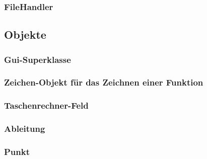 \documentclass[12pt,a4paper]{article}
\newcommand{\project}{/home/jonas/Dokumente/Java-Projekte/GraphingCalculator/src/main/java/de/jonas/graphingcalculator}
\begin{document}
    \newpage

    \subsubsection{FileHandler}
    

    \newpage
    
    \subsection{Objekte}

    \subsubsection{Gui-Superklasse}
    

    \newpage
    
    \subsubsection{Zeichen-Objekt für das Zeichnen einer Funktion}
    

    \newpage

    \subsubsection{Taschenrechner-Feld}
    

    \newpage

    \subsubsection{Ableitung}
    

    \newpage

    \subsubsection{Punkt}
    
\end{document}
